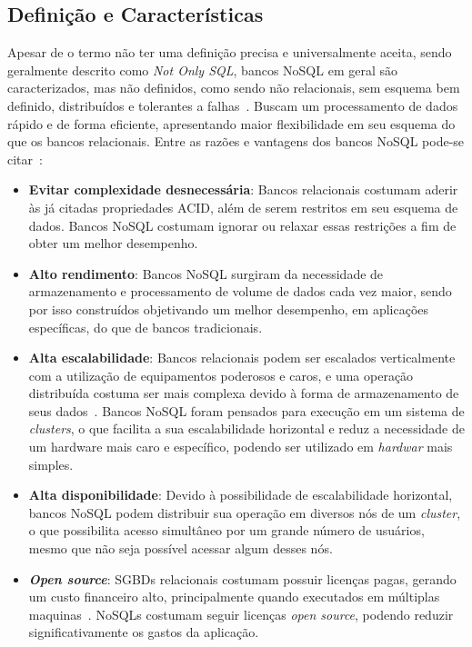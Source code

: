 \subsection{Definição e Características}
Apesar de o termo não ter uma definição precisa e universalmente aceita, sendo geralmente descrito como \emph{Not Only SQL}, bancos NoSQL em geral são caracterizados, mas não definidos, como sendo não relacionais, sem esquema bem definido, distribuídos e tolerantes a falhas~\cite{pramod}. Buscam um processamento de dados rápido e de forma eficiente, apresentando maior flexibilidade em seu esquema do que os bancos relacionais.
Entre as razões e vantagens dos bancos NoSQL pode-se citar~\cite{chrisnosql}:
\begin{itemize}
	\item \textbf{Evitar complexidade desnecessária}: Bancos relacionais costumam aderir às já citadas propriedades ACID, além de serem restritos em seu esquema de dados. Bancos NoSQL costumam ignorar ou relaxar essas restrições a fim de obter um melhor desempenho.
	
	\item \textbf{Alto rendimento}: Bancos NoSQL surgiram da necessidade de armazenamento e processamento de volume de dados cada vez maior, sendo por isso construídos objetivando um melhor desempenho, em aplicações específicas, do que de bancos tradicionais.
	
	\item \textbf{Alta escalabilidade}: Bancos relacionais podem ser escalados verticalmente com a utilização de equipamentos poderosos e caros, e uma operação distribuída costuma ser mais complexa devido à forma de armazenamento de seus dados~\cite{leavitt2010nosql}. Bancos NoSQL foram pensados para execução em um sistema de \emph{clusters}, o que facilita a sua escalabilidade horizontal e reduz a necessidade de um hardware mais caro e específico, podendo ser utilizado em \emph{hardwar} mais simples. 
	
	\item \textbf{Alta disponibilidade}: Devido à possibilidade de escalabilidade horizontal, bancos NoSQL podem distribuir sua operação em diversos nós de um \emph{cluster}, o que possibilita acesso simultâneo por um grande número de usuários, mesmo que não seja possível acessar algum desses nós. 
	
	\item \textbf{\emph{Open source}}: SGBDs relacionais costumam possuir licenças pagas, gerando um custo financeiro alto, principalmente quando executados em múltiplas maquinas~\cite{pramod}. NoSQLs costumam seguir licenças \emph{open source}, podendo reduzir significativamente os gastos da aplicação. 
\end{itemize}

